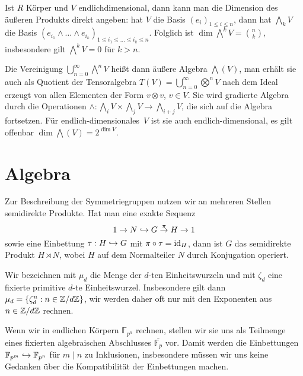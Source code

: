 Ist $R$ Körper und $V$ endlichdimensional, dann kann man die Dimension des äußeren Produkts direkt angeben: hat $V$ die Basis $(e_i)_{1 \leq i \leq n}$, dann hat $\bigwedge_k V$ die Basis $(e_{i_1} \wedge \dots \wedge e_{i_k})_{1 \leq i_1 \leq \dots \leq i_k \leq n}$. Folglich ist $\dim \bigwedge^k V = \binom nk$, insbesondere gilt $\bigwedge^k V = 0$ für $k > n$.

Die Vereinigung $\bigcup_{n=0}^\infty \bigwedge^n V$ heißt dann äußere Algebra $\bigwedge(V)$, man erhält sie auch als Quotient der Tensoralgebra $T(V) = \bigcup_{n=0}^\infty \bigotimes^n V$ nach dem Ideal erzeugt von allen Elementen der Form $v \otimes v$, $v \in V$. Sie wird gradierte Algebra durch die Operationen $\wedge: \bigwedge_i V \times \bigwedge_j V \to \bigwedge_{i+j} V$, die sich auf die Algebra fortsetzen. Für endlich-dimensionales~$V$ ist sie auch endlich-dimensional, es gilt offenbar $\dim \bigwedge(V) = 2^{\dim V}$.

\section{Algebra}
Zur Beschreibung der Symmetriegruppen nutzen wir an mehreren Stellen semidirekte Produkte. Hat man eine exakte Sequenz
\begin{equation}
1 \to N \into G \overrel\to^\pi H \to 1
\end{equation}
sowie eine Einbettung $\tau: H \hookrightarrow G$ mit $\pi \circ \tau = \operatorname{id}_H$, dann ist $G$ das semidirekte Produkt $H \rtimes N$, wobei $H$ auf dem Normalteiler $N$ durch Konjugation operiert.

Wir bezeichnen mit $\mu_d$ die Menge der $d$-ten Einheitswurzeln und mit $\zeta_d$ eine fixierte primitive $d$-te Einheitswurzel. Insbesondere gilt dann $\mu_d = \{ \zeta_d^n : n \in \Zmod dZ \}$, wir werden daher oft nur mit den Exponenten aus $n \in \Zmod dZ$ rechnen.

Wenn wir in endlichen Körpern $\mathbb F_{p^n}$ rechnen, stellen wir sie uns als Teilmenge eines fixierten algebraischen Abschlusses $\overline{\mathbb F_p}$ vor. Damit werden die Einbettungen $\mathbb F_{p^m} \hookrightarrow \mathbb F_{p^n}$ für $m \mid n$ zu Inklusionen, insbesondere müssen wir uns keine Gedanken über die Kompatibilität der Einbettungen machen.
